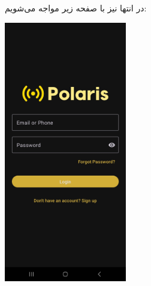 \begin{itemize}
	در انتها نیز با صفحه زیر مواجه می‌شویم:
	\begin{center}
		\includegraphics[width=0.4\textwidth]{images/login-empty.jpg}
	\end{center}
\end{itemize}
